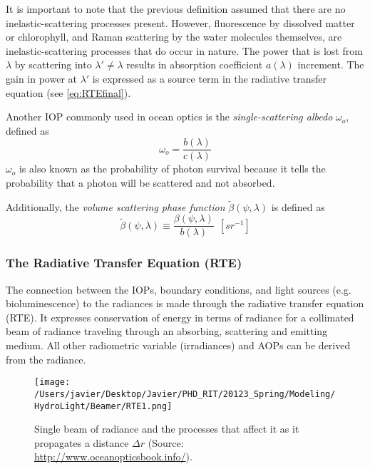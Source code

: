 It is important to note that the previous definition assumed that there are no inelastic-scattering processes present. However, fluorescence by dissolved matter or chlorophyll, and Raman scattering by the water molecules themselves, are inelastic-scattering processes that do occur in nature. The power that is lost from $\lambda$ by scattering into $\lambda'\neq\lambda$ results in absorption coefficient $a(\lambda)$ increment. The gain in power at $\lambda'$ is expressed as a source term in the radiative transfer equation (see \autoref{eq:RTEfinal}).

Another IOP commonly used in ocean optics is the {\it single-scattering albedo}  $\omega_o$, defined as
\begin{equation}
  \omega_o=\frac{b(\lambda)}{c(\lambda)}
\end{equation}
$\omega_o$ is also known as the probability of photon survival because it tells the probability that a photon will be scattered and not absorbed.

Additionally, the {\it volume scattering phase function} $\tilde{\beta}(\psi,\lambda)$  is defined as
\begin{equation}
  \tilde{\beta}(\psi,\lambda)\equiv \frac{\beta(\psi,\lambda)}{b(\lambda)}~~\left[sr^{-1} \right]
\end{equation}

\subsubsection*{The Radiative Transfer Equation (RTE)}
The connection between the IOPs, boundary conditions, and light sources (e.g. bioluminescence) to the radiances is made through the radiative transfer equation (RTE). It expresses conservation of energy in terms of radiance for a collimated beam of radiance traveling through an absorbing, scattering and emitting medium. All other radiometric variable (irradiances) and AOPs can be derived from the radiance.

\begin{figure}[htb]
\centering
      \texttt{[image: /Users/javier/Desktop/Javier/PHD\_RIT/20123\_Spring/Modeling/HydroLight/Beamer/RTE1.png]}
      \caption{Single beam of radiance and the processes that affect it as it propagates a distance $\Delta r$ (Source: \protect\url{http://www.oceanopticsbook.info/}).}
      \label{fig:RTE1}
\end{figure}


